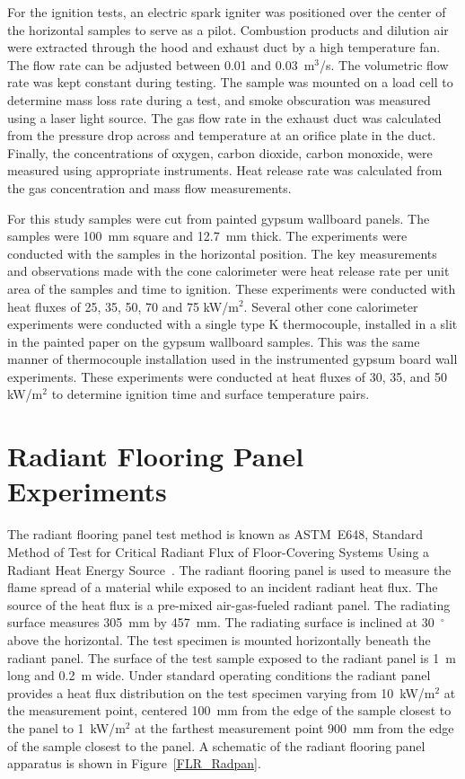 \documentclass[twoside]{uocthesis}
\begin{document}
For the ignition tests, an electric spark igniter was positioned over the center of the horizontal samples to serve as a pilot.  Combustion products and dilution air were extracted through the hood and exhaust duct by a high temperature fan. The flow rate can be adjusted between 0.01 and 0.03~m$^3$/s. The volumetric flow rate was kept constant during testing. The sample was mounted on a load cell to determine mass loss rate during a test, and smoke obscuration was measured using a laser light source. The gas flow rate in the exhaust duct was calculated from the pressure drop across and temperature at an orifice plate in the duct. Finally, the concentrations of oxygen, carbon dioxide, carbon monoxide, were measured using appropriate instruments. Heat release rate was calculated from the gas concentration and mass flow measurements.

For this study samples were cut from painted gypsum wallboard panels. The samples were 100~mm square and 12.7~mm thick. The experiments were conducted with the samples in the horizontal position.  The key measurements and observations made with the cone calorimeter were heat release rate per unit area of the samples and time to ignition. These experiments were conducted with heat fluxes of 25, 35, 50, 70 and 75 kW/m$^2$. Several other cone calorimeter experiments were conducted with a single type K thermocouple, installed in a slit in the painted paper on the gypsum wallboard samples.  This was the same manner of thermocouple installation used in the instrumented gypsum board wall experiments.  These experiments were conducted at heat fluxes of 30, 35, and 50 kW/m$^2$ to determine ignition time and surface temperature pairs.

\section{Radiant Flooring Panel Experiments}

The radiant flooring panel test method is known as ASTM~E648, Standard Method of Test for Critical Radiant Flux of Floor-Covering Systems Using a Radiant Heat Energy Source~\cite{ASTM_E648}.  The radiant flooring panel is used to measure the flame spread of a material while exposed to an incident radiant heat flux. The source of the heat flux is a pre-mixed air-gas-fueled radiant panel.  The radiating surface measures 305~mm by 457~mm. The radiating surface is inclined at 30~$^{\circ}$ above the horizontal. The test specimen is mounted horizontally beneath the radiant panel.  The surface of the test sample exposed to the radiant panel is 1~m long and 0.2~m wide. Under standard operating conditions the radiant panel provides a heat flux distribution on the test specimen varying from 10~kW/m$^2$ at the measurement point, centered 100~mm from the edge of the sample closest to the panel to 1~kW/m$^2$ at the farthest measurement point 900~mm from the edge of the sample closest to the panel. A schematic of the radiant flooring panel apparatus is shown in Figure~\ref{FLR_Radpan}.  
\end{document}
